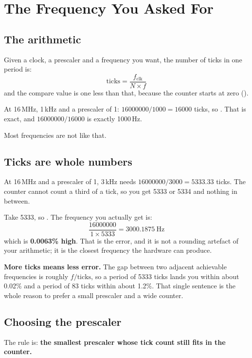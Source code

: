 
\section{The Frequency You Asked For}
\label{c5:sec:frequency}

\subsection{The arithmetic}
\label{c5:sec:arithmetic}
Given a clock, a prescaler and a frequency you want, the number of ticks in one period is:
\[
  \text{ticks} = \frac{f_{\mathrm{clk}}}{N \times f}
\]
and the compare value is one less than that, because the counter starts at zero
().

At 16\,MHz, 1\,kHz and a prescaler of 1: $16000000 / 1000 = 16000$ ticks, so
. That is exact, and $16000000 / 16000$ is exactly 1000\,Hz.

Most frequencies are not like that.

\subsection{Ticks are whole numbers}
\label{c5:sec:whole}
At 16\,MHz and a prescaler of 1, 3\,kHz needs $16000000 / 3000 = 5333.33$ ticks. The counter
cannot count a third of a tick, so you get 5333 or 5334 and nothing in between.

Take 5333, so . The frequency you actually get is:
\[
  \frac{16000000}{1 \times 5333} = 3000.1875\ \text{Hz}
\]
which is \textbf{0.0063\% high}. That is the error, and it is not a rounding artefact of your
arithmetic; it is the closest frequency the hardware can produce.

\textbf{More ticks means less error.} The gap between two adjacent achievable frequencies is
roughly $f / \text{ticks}$, so a period of 5333 ticks lands you within about 0.02\% and a period of
83 ticks within about 1.2\%. That single sentence is the whole reason to prefer a small prescaler
and a wide counter.

\subsection{Choosing the prescaler}
\label{c5:sec:choosing}
The rule is: \textbf{the smallest prescaler whose tick count still fits in the counter.}

